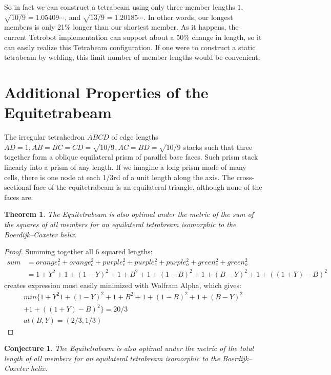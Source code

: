 \documentclass[11pt]{article}
\newtheorem{theorem}{Theorem}
\newtheorem{conjecture}{Conjecture}
\begin{document}
So in fact we can construct a tetrabeam using only three member lengths $1$,
$\sqrt{10/9} = 1.05409\cdots$, and $\sqrt{13/9} = 1.20185\cdots$.
In other words, our longest members is only 21\% longer than our shortest member.
As it happens, the current Tetrobot implementation can support about a 50\%
change in length, so it can easily realize this Tetrabeam configuration. If one were
to construct a static tetrabeam by welding, this limit number of member lengths would be convenient.

\section{Additional Properties of the Equitetrabeam}

The irregular tetrahedron $ABCD$ of edge lengths $AD = 1, AB = BC = CD = \sqrt{10/9}, AC = BD = \sqrt{10/9}$ stacks
such that three together form a oblique equilateral prism of parallel base faces. Such prism stack linearly into
a prism of any length. If we imagine a long prism made of many cells, there is one node at each 1/3rd of a unit length
along the axis. The cross-sectional face of the equitetrabeam is an equilateral triangle, although none of the faces
are.

\begin{theorem}
  The Equitetrabeam is also optimal under the metric of the sum of the squares of all members
  for an equilateral tetrabream isomorphic to the Boerdijk--Coxeter helix.
  \end{theorem}

\begin{proof}
  Summing together all 6 squared lengths:
\begin{align*}
  sum &= orange_e^2 + orange_o^2 + purple_e^2 + purple_e^2 + purple_o^2 + green_e^2 + green_o^2 \\
   &= 1 + Y^2 + 1 + (1-Y)^2 +  1 + B^2 +  1+ (1-B)^2 + 1 + (B - Y)^2 + 1 + ((1+Y) - B)^2 
\end{align*}
  creates expression most easily minimized with Wolfram Alpha, which gives:
\begin{align*}
min\{1 + Y^2 1 + (1 - Y)^2 + 1 + B^2 + 1 + (1 - B)^2 + 1 + (B - Y)^2 \\
  + 1 + ((1 + Y) - B)^2\} = 20/3 \\
at (B, Y) = (2/3, 1/3)
\end{align*}
  
\end{proof}

\begin{conjecture}
  The Equitetrabeam is also optimal under the metric of the total length of all members 
  for an equilateral tetrabream isomorphic to the Boerdijk--Coxeter helix.
\end{conjecture}
\end{document}
